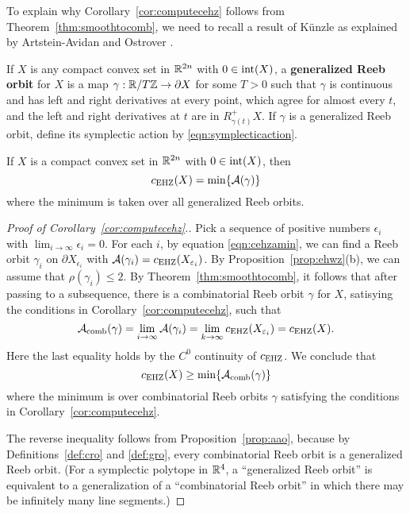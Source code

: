 To explain why Corollary~\ref{cor:computecehz} follows from Theorem~\ref{thm:smoothtocomb}, we need to recall a result of K\"unzle \cite{kunzle} as explained by Artstein-Avidan and Ostrover \cite{artsteinostrover2014}. 

\begin{definition}
\label{def:gro}
If $X$ is any compact convex set in ${\mathbb R}^{2n}$ with $0\in\operatorname{int}(X)$, a {\bf generalized Reeb orbit\/} for $X$ is a map $\gamma:{\mathbb R}/T{\mathbb Z}\to\partial X$ for some $T>0$ such that $\gamma$ is continuous and has left and right derivatives at every point, which agree for almost every $t$, and the left and right derivatives at $t$ are in $R_{\gamma(t)}^+X$. If $\gamma$ is a generalized Reeb orbit, define its symplectic action by \eqref{eqn:symplecticaction}.
\end{definition}

\begin{proposition}
\cite[Prop.\ 2.7]{artsteinostrover2014}
\label{prop:aao}
If $X$ is a compact convex set in ${\mathbb R}^{2n}$ with $0\in\operatorname{int}(X)$, then
\[
c_{\operatorname{EHZ}}(X) = \operatorname{min}\{{\mathcal A}(\gamma)\}
\]
where the minimum is taken over all generalized Reeb orbits.
\end{proposition}

\begin{proof}[Proof of Corollary~\ref{cor:computecehz}.]
Pick a sequence of positive numbers $\epsilon_i$ with $\lim_{i\to\infty} \epsilon_i = 0$. For each $i$, by equation \eqref{eqn:cehzamin}, we can find a Reeb orbit $\gamma_i$ on $\partial X_{\epsilon_i}$ with ${\mathcal A}(\gamma_i) = c_{\operatorname{EHZ}}(X_{\varepsilon_i})$. By Proposition~\ref{prop:ehwz}(b), we can assume that $\rho(\gamma_i)\le 2$. By Theorem~\ref{thm:smoothtocomb}, it follows that after passing to a subsequence, there is a combinatorial Reeb orbit $\gamma$ for $X$, satisying the conditions in Corollary~\ref{cor:computecehz}, such that
\[
{\mathcal A}_{\operatorname{comb}}(\gamma) = \lim_{i\to\infty}{\mathcal A}(\gamma_i) = \lim_{k\to\infty}c_{\operatorname{EHZ}}(X_{\varepsilon_i}) = c_{\operatorname{EHZ}}(X).
\]
Here the last equality holds by the $C^0$ continuity of $c_{\operatorname{EHZ}}$. We conclude that
\[
c_{\operatorname{EHZ}}(X)\ge \operatorname{min}\{{\mathcal A}_{\operatorname{comb}}(\gamma)\}
\]
where the minimum is over combinatorial Reeb orbits $\gamma$ satisfying the conditions in Corollary~\ref{cor:computecehz}.

The reverse inequality follows from Proposition~\ref{prop:aao}, because by Definitions~\ref{def:cro} and \ref{def:gro}, every combinatorial Reeb orbit is a generalized Reeb orbit. (For a symplectic polytope in ${\mathbb R}^4$, a ``generalized Reeb orbit'' is equivalent to a generalization of a ``combinatorial Reeb orbit'' in which there may be infinitely many line segments.)
\end{proof}


